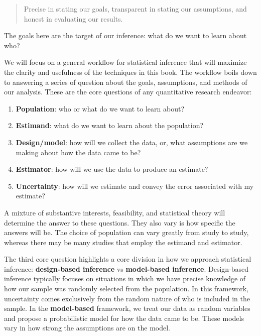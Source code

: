 \documentclass[
  letterpaper,
  DIV=11,
  numbers=noendperiod]{scrreprt}
\providecommand{\tightlist}{%
  \setlength{\itemsep}{0pt}\setlength{\parskip}{0pt}}\usepackage{longtable,booktabs,array}
\theoremstyle{definition}
\theoremstyle{definition}
\theoremstyle{plain}
\theoremstyle{remark}
\begin{document}
\begin{quote}
Precise in stating our goals, transparent in stating our assumptions,
and honest in evaluating our results.
\end{quote}

The goals here are the target of our inference: what do we want to learn
about who?

We will focus on a general workflow for statistical inference that will
maximize the clarity and usefulness of the techniques in this book. The
workflow boils down to answering a series of question about the goals,
assumptions, and methods of our analysis. These are the core questions
of any quantitative research endeavor:

\begin{enumerate}
\def\labelenumi{\arabic{enumi}.}
\tightlist
\item
  \textbf{Population}: who or what do we want to learn about?
\item
  \textbf{Estimand}: what do we want to learn about the population?\\
\item
  \textbf{Design/model}: how will we collect the data, or, what
  assumptions are we making about how the data came to be?
\item
  \textbf{Estimator}: how will we use the data to produce an estimate?
\item
  \textbf{Uncertainty}: how will we estimate and convey the error
  associated with my estimate?
\end{enumerate}

A mixture of substantive interests, feasibility, and statistical theory
will determine the answer to these questions. They also vary is how
specific the answers will be. The choice of population can vary greatly
from study to study, whereas there may be many studies that employ the
estimand and estimator.

The third core question highlights a core division in how we approach
statistical inference: \textbf{design-based inference} vs
\textbf{model-based inference}. Design-based inference typically focuses
on situations in which we have precise knowledge of how our sample was
randomly selected from the population. In this framework, uncertainty
comes exclusively from the random nature of who is included in the
sample. In the \textbf{model-based} framework, we treat our data as
random variables and propose a probabilistic model for how the data came
to be. These models vary in how strong the assumptions are on the model.
\end{document}
